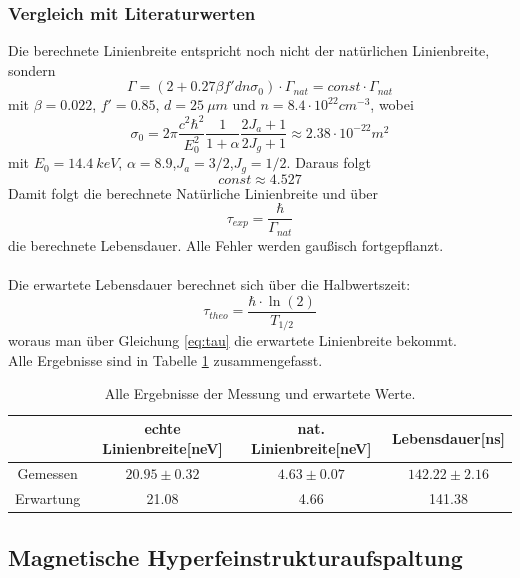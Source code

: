\documentclass[12pt,a4paper]{article}
\begin{document}
\subsubsection{Vergleich mit Literaturwerten}
Die berechnete Linienbreite entspricht noch nicht der natürlichen Linienbreite, sondern
\begin{equation*}
\Gamma = (2+0.27\beta f' d n \sigma_0) \cdot \Gamma_{nat} = const \cdot \Gamma_{nat}
\end{equation*}
mit $\beta = 0.022$, $f' = 0.85$, $d = \SI{25}{\mu m}$ und $n=8.4\cdot 10^{22} \si{cm^{-3}}$, wobei 
\begin{equation*}
\sigma_0 = 2 \pi \dfrac{c^2 \hbar^2}{E_0^2} \dfrac{1}{1+\alpha} \dfrac{2 J_a+1}{2 J_g+1} \approx 2.38\cdot 10^{-22} m^2
\end{equation*}
mit $E_0 = \SI{14.4}{keV}$, $\alpha = 8.9$,$J_a = 3/2$,$J_g = 1/2$. Daraus folgt 
\begin{equation*}
const \approx 4.527
\end{equation*}
Damit folgt die berechnete Natürliche Linienbreite und über
\begin{equation}
\tau_{exp} = \dfrac{\hbar}{\Gamma_{nat}}
\label{eq:tau}
\end{equation}
die berechnete Lebensdauer. Alle Fehler werden gaußisch fortgepflanzt.\\
\\
Die erwartete Lebensdauer berechnet sich über die Halbwertszeit:
\begin{equation*}
\tau_{theo} = \dfrac{\hbar\cdot \ln(2)}{T_{1/2}}
\end{equation*}
woraus man über Gleichung \ref{eq:tau} die erwartete Linienbreite bekommt.\\
Alle Ergebnisse sind in Tabelle \ref{tab:Ein_lit} zusammengefasst.

\begin{table}
\centering
\begin{tabular}{|c|c|c|c|}
\hline 
 & echte Linienbreite[neV] & nat. Linienbreite[neV] & Lebensdauer[ns]\\ 
\hline 
Gemessen & $20.95\pm 0.32$ & $4.63\pm 0.07$ & $142.22\pm2.16$\\ 
\hline 
Erwartung & 21.08 & 4.66 & 141.38\\ 
\hline 
\end{tabular} 
\caption{Alle Ergebnisse der Messung und erwartete Werte.}
\label{tab:Ein_lit}
\end{table}

\newpage
\subsection{Magnetische Hyperfeinstrukturaufspaltung}
\end{document}
